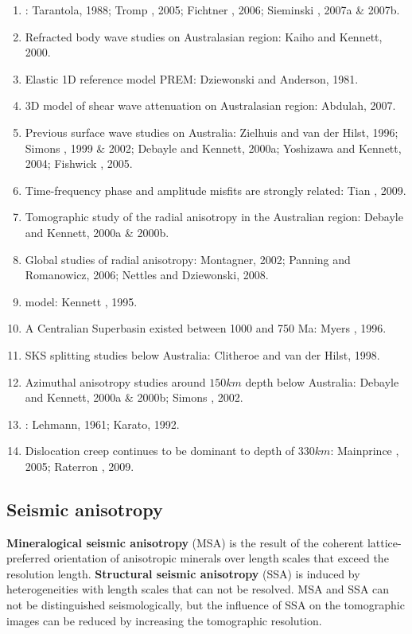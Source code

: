 \begin{enumerate}[\hspace{10mm}*]
  \item {}: Tarantola, 1988; Tromp \etal, 2005; Fichtner \etal, 2006;
    Sieminski \etal, 2007a \& 2007b.
  \item Refracted body wave studies on Australasian region: Kaiho and Kennett, 2000.
  \item Elastic 1D reference model PREM: Dziewonski and Anderson, 1981.
  \item 3D model of shear wave attenuation on Australasian region: Abdulah, 2007.
  \item Previous surface wave studies on Australia: Zielhuis and van der Hilst, 1996;
    Simons \etal, 1999 \& 2002; Debayle and Kennett, 2000a; Yoshizawa and Kennett, 2004;
    Fishwick \etal, 2005. 
  \item Time-frequency phase and amplitude misfits are strongly related: Tian \etal, 2009.
  \item Tomographic study of the radial anisotropy in the Australian region:
    Debayle and Kennett, 2000a \& 2000b.
  \item Global studies of radial anisotropy: Montagner, 2002; Panning and Romanowicz, 2006;
    Nettles and Dziewonski, 2008.
  \item {} model: Kennett \etal, 1995.
  \item A Centralian Superbasin existed between 1000 and 750 Ma: Myers \etal, 1996.
  \item SKS splitting studies below Australia: Clitheroe and van der Hilst, 1998.
  \item Azimuthal anisotropy studies around $150km$ depth below Australia:
    Debayle and Kennett, 2000a \& 2000b; Simons \etal, 2002.
  \item {}: Lehmann, 1961; Karato, 1992.
  \item Dislocation creep continues to be dominant to depth of $330km$:
    Mainprince \etal, 2005; Raterron \etal, 2009.
\end{enumerate}

\subsection{Seismic anisotropy}
\textbf{Mineralogical seismic anisotropy} (MSA) is the result of
the coherent lattice-preferred orientation of anisotropic minerals over length scales
that exceed the resolution length.
\textbf{Structural seismic anisotropy} (SSA) is induced by heterogeneities with length scales
that can not be resolved.
MSA and SSA can not be distinguished seismologically,
but the influence of SSA on the tomographic images can be reduced
by increasing the tomographic resolution.

